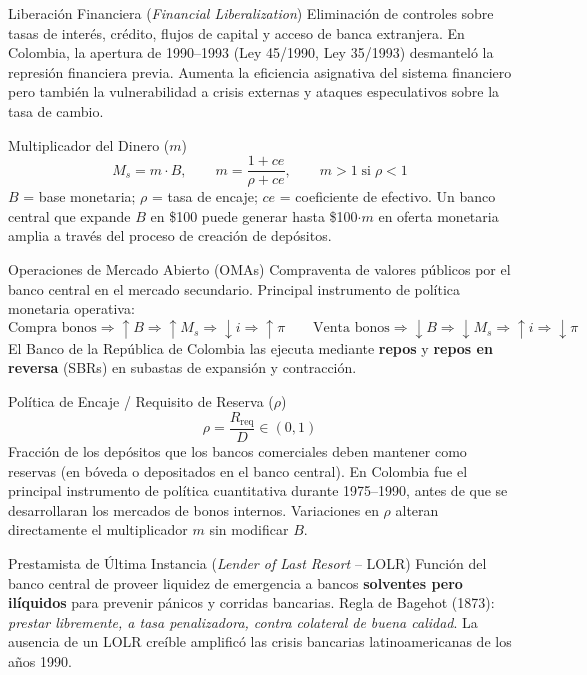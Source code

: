 \documentclass[12pt,a4paper]{article}
\begin{document}
\begin{defbox}{Liberación Financiera (\textit{Financial Liberalization})}
Eliminación de controles sobre tasas de interés, crédito, flujos de capital y
acceso de banca extranjera. En Colombia, la apertura de 1990--1993 (Ley 45/1990,
Ley 35/1993) desmanteló la represión financiera previa. Aumenta la eficiencia
asignativa del sistema financiero pero también la vulnerabilidad a crisis externas
y ataques especulativos sobre la tasa de cambio.
\end{defbox}

\begin{defbox}{Multiplicador del Dinero ($m$)}
\begin{equation}
M_s = m\cdot B,\qquad m = \frac{1+ce}{\rho+ce},\qquad m>1\;\text{si}\;\rho<1
\end{equation}
$B$ = base monetaria; $\rho$ = tasa de encaje; $ce$ = coeficiente de efectivo.
Un banco central que expande $B$ en \$100 puede generar hasta \$100$\cdot m$ en
oferta monetaria amplia a través del proceso de creación de depósitos.
\end{defbox}

\begin{defbox}{Operaciones de Mercado Abierto (OMAs)}
Compraventa de valores públicos por el banco central en el mercado secundario.
Principal instrumento de política monetaria operativa:
\[\text{Compra bonos}\Rightarrow\uparrow B\Rightarrow\uparrow M_s\Rightarrow\downarrow i\Rightarrow\uparrow\pi
\qquad\text{Venta bonos}\Rightarrow\downarrow B\Rightarrow\downarrow M_s\Rightarrow\uparrow i\Rightarrow\downarrow\pi\]
El Banco de la República de Colombia las ejecuta mediante \textbf{repos} y
\textbf{repos en reversa} (SBRs) en subastas de expansión y contracción.
\end{defbox}

\begin{defbox}{Política de Encaje / Requisito de Reserva ($\rho$)}
\[\rho = \frac{R_{\text{req}}}{D}\in(0,1)\]
Fracción de los depósitos que los bancos comerciales deben mantener como reservas
(en bóveda o depositados en el banco central). En Colombia fue el principal
instrumento de política cuantitativa durante 1975--1990, antes de que se
desarrollaran los mercados de bonos internos. Variaciones en $\rho$ alteran
directamente el multiplicador $m$ sin modificar $B$.
\end{defbox}

\begin{defbox}{Prestamista de Última Instancia (\textit{Lender of Last Resort} -- LOLR)}
Función del banco central de proveer liquidez de emergencia a bancos
\textbf{solventes pero ilíquidos} para prevenir pánicos y corridas bancarias.
Regla de Bagehot (1873): \textit{prestar libremente, a tasa penalizadora, contra
colateral de buena calidad}. La ausencia de un LOLR creíble amplificó las crisis
bancarias latinoamericanas de los años 1990.
\end{defbox}
\end{document}
